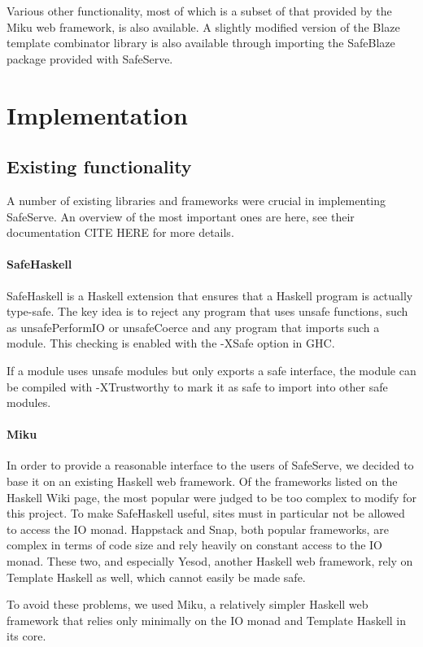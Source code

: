 \documentclass[12pt]{article}
\begin{document}
Various other functionality, most of which is a subset of that provided by the
Miku web framework, is also available.  A slightly modified version of the
Blaze template combinator library is also available through importing
the SafeBlaze package provided with SafeServe.

\section{Implementation}

\subsection{Existing functionality}
A number of existing libraries and frameworks were crucial in implementing SafeServe.
An overview of the most important ones are here, see their documentation CITE HERE
for more details.
\paragraph{SafeHaskell}
SafeHaskell is a Haskell extension that ensures that a Haskell program
is actually type-safe.  The key idea is to reject any program that uses
unsafe functions, such as unsafePerformIO or unsafeCoerce and any
program that imports such a module.  This checking is enabled with the -XSafe
option in GHC.

If a module uses unsafe modules but only exports a safe interface, the
module can be compiled with -XTrustworthy to mark it as safe to import into
other safe modules.

\paragraph{Miku}
In order to provide a reasonable interface to the users of SafeServe, we
decided to base it on an existing Haskell web framework.  Of the frameworks
listed on the Haskell Wiki page, the most popular were judged to be too
complex to modify for this project.  To make SafeHaskell useful, sites
must in particular not be allowed to access the IO monad.  Happstack and
Snap, both popular frameworks, are complex in terms of code size and
rely heavily on constant access to the IO monad.  These two, and especially
Yesod, another Haskell web framework, rely on Template Haskell as well,
which cannot easily be made safe.

To avoid these problems, we used Miku, a relatively simpler Haskell
web framework that relies only minimally on the IO monad and Template Haskell
in its core.
\end{document}

